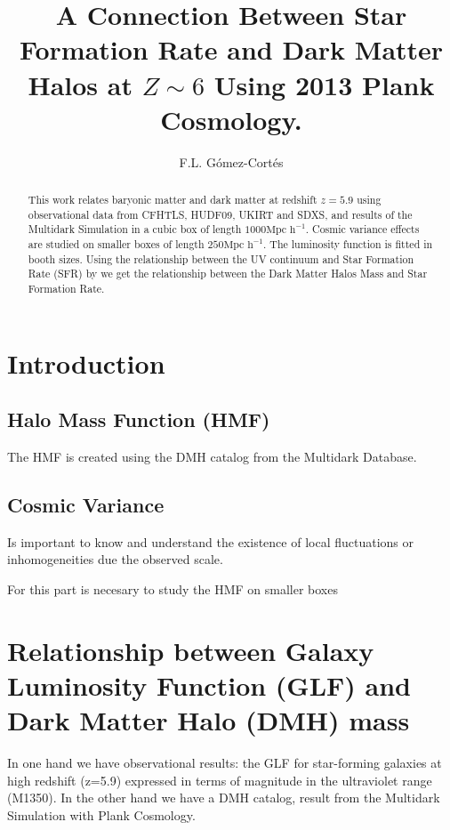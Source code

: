 \documentclass[manuscript]{aastex}
\begin{document}
\title{A Connection Between Star Formation Rate and Dark Matter Halos at $Z\sim6$ Using 2013 Plank Cosmology.}

\author{F.L. G\'omez-Cort\'es }

\begin{abstract}
This work relates baryonic matter and dark matter at redshift $z=5.9$ using observational data
from CFHTLS\citep{willott13}, HUDF09\citep{bouwens06,bouwens12}, UKIRT and SDXS\citep{mclure09}, and results of the Multidark Simulation \citep{riebe13}
in a cubic box of length $1000 \textrm{Mpc h}^{-1}$. Cosmic variance effects are studied on smaller boxes of length $250 \textrm{Mpc h}^{-1}$.
The luminosity function is fitted in booth sizes. Using the relationship between the UV continuum and Star Formation Rate (SFR) by \cite{kennicutt98}
we get the relationship between the Dark Matter Halos Mass and Star Formation Rate.
\end{abstract}

\section{Introduction}
\subsection{Halo Mass Function (HMF)}
The HMF is created using the DMH catalog from the Multidark Database.
\subsection{Cosmic Variance}
Is important to know and understand the existence of local fluctuations
or inhomogeneities due the observed scale.

For this part is necesary to study the HMF on smaller boxes

\section{Relationship between Galaxy Luminosity Function (GLF) and
Dark Matter Halo (DMH) mass}

In one hand we have observational results: the GLF for star-forming galaxies at high redshift (z=5.9)\citep{bouwens06,willott13}
expressed in terms of magnitude in the ultraviolet range (M1350). In the other hand we have a DMH 
catalog, result from the Multidark Simulation with Plank Cosmology. %
\end{document}
